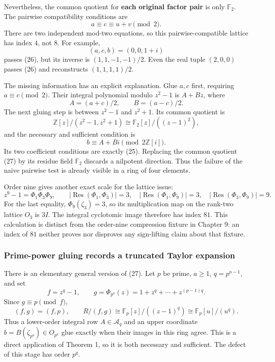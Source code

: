 \documentclass[
  11pt,
]{article}
\begin{document}
Nevertheless, the common quotient for \textbf{each original factor pair}
is only \(\mathbb F_2\). The pairwise compatibility conditions are \[
                  a\equiv c\equiv u+v\pmod2.              \tag{26}
\] There are two independent mod-two equations, so this
pairwise-compatible lattice has index \(4\), not \(8\). For example, \[
          (a,c,b)=(0,0,1+i)
 \] passes (26), but its inverse is \((1,1,-1,-1)/2\). Even the real
tuple \((2,0,0)\) passes (26) and reconstructs \((1,1,1,1)/2\).

The missing information has an explicit explanation. Glue \(a,c\) first,
requiring \(a\equiv c\pmod2\). Their integral polynomial modulo
\(z^2-1\) is \(A+Bz\), where \[
 A=(a+c)/2,\qquad B=(a-c)/2.
 \] The next gluing step is between \(z^2-1\) and \(z^2+1\). Its common
quotient is \[
 \mathbb Z[z]/(z^2-1,z^2+1)
       \cong\mathbb F_2[z]/((z-1)^2),                     \tag{27}
\] and the necessary and sufficient condition is \[
                 b\equiv A+Bi\pmod{2\mathbb Z[i]}.
 \] Its two coefficient conditions are exactly (25). Replacing the
common quotient (27) by its residue field \(\mathbb F_2\) discards a
nilpotent direction. Thus the failure of the naive pairwise test is
already visible in a ring of four elements.

Order nine gives another exact scale for the lattice issue: \[
 z^9-1=\Phi_1\Phi_3\Phi_9,\qquad
 |\operatorname{Res}(\Phi_1,\Phi_3)|=3,\quad
 |\operatorname{Res}(\Phi_1,\Phi_9)|=3,\quad
 |\operatorname{Res}(\Phi_3,\Phi_9)|=9.
 \] For the last equality, \(\Phi_9(\zeta_3)=3\), so its multiplication
map on the rank-two lattice \(O_3\) is \(3I\). The integral cyclotomic
image therefore has index \(81\). This calculation is distinct from the
order-nine compression fixture in Chapter 9: an index of \(81\) neither
proves nor disproves any sign-lifting claim about that fixture.

\subsubsection{Prime-power gluing records a truncated Taylor
expansion}\label{prime-power-gluing-records-a-truncated-taylor-expansion}

There is an elementary general version of (27). Let \(p\) be prime,
\(a\ge1\), \(q=p^{a-1}\), and set \[
 f=z^q-1,\qquad
 g=\Phi_{p^a}(z)=1+z^q+\cdots+z^{(p-1)q}.
 \] Since \(g\equiv p\pmod f\), \[
 (f,g)=(f,p),\qquad
 R/(f,g)\cong\mathbb F_p[z]/((z-1)^q)
              \cong\mathbb F_p[u]/(u^q).                 \tag{27a}
\] Thus a lower-order integral row \(A\in\mathcal A_q\) and an upper
coordinate \(b=B(\zeta_{p^a})\in O_{p^a}\) glue exactly when their
images in this ring agree. This is a direct application of Theorem 1, so
it is both necessary and sufficient. The defect of this stage has order
\(p^q\).
\end{document}
